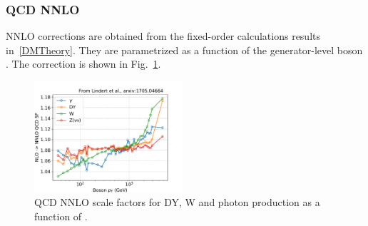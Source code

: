 \subsubsection{QCD NNLO}

NNLO corrections are obtained from the fixed-order calculations results in~\ref{DMTheory}. They are parametrized as a function of the generator-level boson \pt. The correction is shown in Fig.~\ref{fig:theory_sf_qcd_nnlo}.



\begin{figure}[ht!]
    \begin{center}
        \includegraphics[width=0.49\textwidth]{fig/theory/qcdnnlo/nnlo_qcd.pdf}
        \caption{
            QCD NNLO scale factors for DY, W and photon production as a function of \ptv.
          }
      \label{fig:theory_sf_qcd_nnlo}
    \end{center}
  \end{figure}